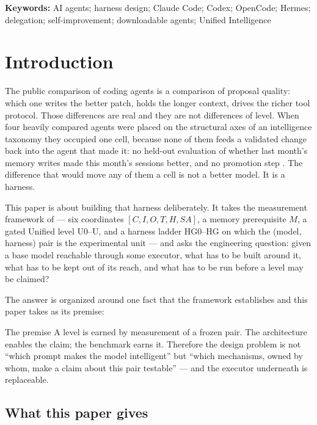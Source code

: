 \noindent\textbf{Keywords:} AI agents; harness design; Claude Code; Codex; OpenCode; Hermes; delegation; self-improvement; downloadable agents; Unified Intelligence

\tableofcontents
\bigskip

\section{Introduction}\label{sec:intro}

The public comparison of coding agents is a comparison of proposal quality: which one writes the better patch, holds the longer context, drives the richer tool protocol. Those differences are real and they are not differences of level. When four heavily compared agents were placed on the structural axes of an intelligence taxonomy they occupied one cell, because none of them feeds a validated change back into the agent that made it: no held-out evaluation of whether last month's memory writes made this month's sessions better, and no promotion step \citep{yang2026capability}. The difference that would move any of them a cell is not a better model. It is a harness.

This paper is about building that harness deliberately. It takes the measurement framework of \citet{yang2026unified} --- six coordinates $[C,I,O,T,H,SA]$, a memory prerequisite $M$, a gated Unified level U0--U\Om{}, and a harness ladder HG0--HG\Om{} on which the (model, harness) pair is the experimental unit --- and asks the engineering question: given a base model reachable through some executor, what has to be built around it, what has to be kept out of its reach, and what has to be run before a level may be claimed?

The answer is organized around one fact that the framework establishes and this paper takes as its premise:

\begin{claimbox}{The premise}
A level is earned by measurement of a frozen pair. The architecture enables the claim; the benchmark earns it. Therefore the design problem is not ``which prompt makes the model intelligent'' but ``which mechanisms, owned by whom, make a claim about this pair testable'' --- and the executor underneath is replaceable.
\end{claimbox}

\subsection{What this paper gives}

